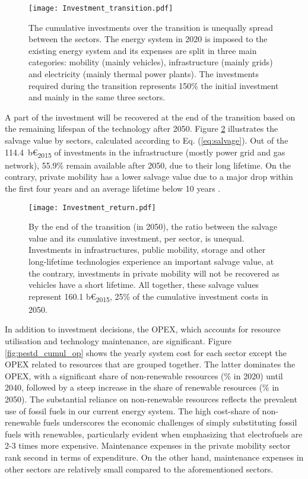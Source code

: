\begin{figure}[!htbp]
\centering
\texttt{[image: Investment\_transition.pdf]}
\caption{The cumulative investments over the transition is unequally spread between the sectors. The energy system in 2020 is imposed to the existing energy system and its expenses are split in three main categories: mobility (mainly vehicles), infrastructure (mainly grids) and electricity (mainly thermal power plants). The investments required during the transition represents 150\% the initial investment and mainly in the same three sectors. }
\label{fig:pestd_cumul_inv}
\end{figure}

A part of the investment will be recovered at the end of the transition based on the remaining lifespan of the technology after 2050. Figure \ref{fig:pestd_inv_return} illustrates the salvage value by sectors, calculated according to Eq. (\ref{eq:salvage}). Out of the 114.4~b€\textsubscript{2015} of investments in the infrastructure (\ie mostly power grid and gas network), 55.9\% remain available after 2050, due to their long lifetime. On the contrary, private mobility has a lower salvage value due to a major drop within the first four years and an average lifetime below 10 years \cite{febiac2021datadigest}. 


\begin{figure}[!htbp]
\centering
\texttt{[image: Investment\_return.pdf]}
\caption{By the end of the transition (\ie in 2050), the ratio between the salvage value and its cumulative investment, per sector, is unequal. Investments in infrastructures, public mobility, storage and other long-lifetime technologies experience an important salvage value, at the contrary, investments in private mobility will not be recovered as vehicles have a short lifetime. All together, these salvage values represent 160.1 b€\textsubscript{2015}, 25\% of the cumulative investment costs in 2050.}
\label{fig:pestd_inv_return}
\end{figure}

In addition to investment decisions, the \acrfull{OPEX}, which accounts for resource utilisation and technology maintenance, are significant. Figure \ref{fig:pestd_cumul_op} shows the yearly system cost for each sector except the \gls{OPEX} related to resources that are grouped together. The latter dominates the \gls{OPEX}, with a significant share of non-renewable resources (\% in 2020) until 2040, followed by a steep increase in the share of renewable resources (\% in 2050). The substantial reliance on non-renewable resources reflects the prevalent use of fossil fuels in our current energy system. The high cost-share of non-renewable fuels underscores the economic challenges of simply substituting fossil fuels with renewables, particularly evident when emphasizing that electrofuels are 2-3 times more expensive. Maintenance expenses in the private mobility sector rank second in terms of expenditure. On the other hand, maintenance expenses in other sectors are relatively small compared to the aforementioned sectors.

